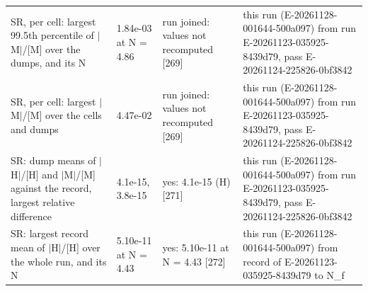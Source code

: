 \begin{table}
\begin{tabular}{p{}p{}p{}p{}}
SR, per cell: largest 99.5th percentile of $|$M$|$/\allowbreak{}[M] over the dumps, and its N & 1.84e-03 at N = 4.86 & run joined: values not recomputed [269] & this run (E-20261128-001644-500a097) from run E-20261123-035925-8439d79, pass E-20261124-225826-0bf3842 \\
SR, per cell: largest $|$M$|$/\allowbreak{}[M] over the cells and dumps & 4.47e-02 & run joined: values not recomputed [269] & this run (E-20261128-001644-500a097) from run E-20261123-035925-8439d79, pass E-20261124-225826-0bf3842 \\
SR: dump means of $|$H$|$/\allowbreak{}[H] and $|$M$|$/\allowbreak{}[M] against the record, largest relative difference & 4.1e-15, 3.8e-15 & yes: 4.1e-15 (H) [271] & this run (E-20261128-001644-500a097) from run E-20261123-035925-8439d79, pass E-20261124-225826-0bf3842 \\
SR: largest record mean of $|$H$|$/\allowbreak{}[H] over the whole run, and its N & 5.10e-11 at N = 4.43 & yes: 5.10e-11 at N = 4.43 [272] & this run (E-20261128-001644-500a097) from record of E-20261123-035925-8439d79 to N\_f \\
\bottomrule
\end{tabular}
\end{table}

